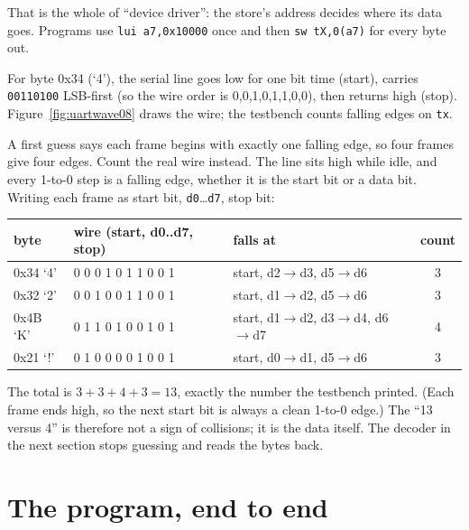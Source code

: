 \noindent That is the whole of ``device driver'': the store's
address decides where its data goes. Programs use
\texttt{lui a7,0x10000} once and then \texttt{sw tX,0(a7)} for every
byte out.





\begin{example}
For byte 0x34 (`4'), the serial line goes low for one bit time
(start), carries \texttt{00110100} LSB-first (so the wire order is
0,0,1,0,1,1,0,0), then returns high (stop). Figure~\ref{fig:uartwave08}
draws the wire; the testbench counts falling edges on \texttt{tx}.
\end{example}

\begin{example}
A first guess says each frame begins with exactly one falling edge, so
four frames give four edges. Count the real wire instead. The line sits
high while idle, and every 1-to-0 step is a falling edge, whether it
is the start bit or a data bit. Writing each frame as start bit,
\texttt{d0}\ldots\texttt{d7}, stop bit:
\begin{center}
\begin{tabular}{@{}lllc@{}}
\toprule
byte & wire (start, d0..d7, stop) & falls at & count \\
\midrule
0x34 `4' & 0 0 0 1 0 1 1 0 0 1 & start, d2$\to$d3, d5$\to$d6 & 3 \\
0x32 `2' & 0 0 1 0 0 1 1 0 0 1 & start, d1$\to$d2, d5$\to$d6 & 3 \\
0x4B `K' & 0 1 1 0 1 0 0 1 0 1 & start, d1$\to$d2, d3$\to$d4, d6$\to$d7 & 4 \\
0x21 `!' & 0 1 0 0 0 0 1 0 0 1 & start, d0$\to$d1, d5$\to$d6 & 3 \\
\bottomrule
\end{tabular}
\end{center}
\noindent The total is \(3+3+4+3=13\), exactly the number the
testbench printed. (Each frame ends high, so the next start bit is
always a clean 1-to-0 edge.) The ``13 versus 4'' is therefore not a
sign of collisions; it is the data itself. The decoder in the next
section stops guessing and reads the bytes back.
\end{example}

\section{The program, end to end}
\label{sec:program08}

